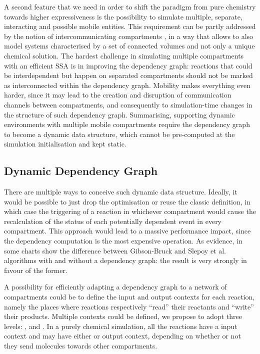 \documentclass[12pt,a4paper,twoside,openright]{book}
\begin{document}
A second feature that we need in order to shift the paradigm from pure chemistry towards higher expressiveness is the possibility to simulate multiple, separate, interacting and possible mobile entities.
%
This requirement can be partly addressed by the notion of intercommunicating compartments \cite{CiocchettaH09,versari08,montagna-cs2bio10,btssoc-jos7}, in a way that allows to also model systems characterised by a set of connected volumes and not only a unique chemical solution.
%
The hardest challenge in simulating multiple compartments with an efficient SSA is in improving the dependency graph: reactions that could be interdependent but happen on separated compartments should not be marked as interconnected within the dependency graph.
%
Mobility makes everything even harder, since it may lead to the creation and disruption of communication channels between compartments, and consequently to simulation-time changes in the structure of such dependency graph.
%
Summarising, supporting dynamic environments with multiple mobile compartments require the dependency graph to become a dynamic data structure, which cannot be pre-computed at the simulation initialisation and kept static.

\subsection{Dynamic Dependency Graph}

There are multiple ways to conceive such dynamic data structure.
%
Ideally, it would be possible to just drop the optimisation or reuse the classic definition, in which case the triggering of a reaction in whichever compartment would cause the recalculation of the status of each potentially dependent event in every compartment.
%
This approach would lead to a massive performance impact, since the dependency computation is the most expensive operation.
%
As evidence, in \cite{slepoy2008} some charts show the difference between Gibson-Bruck and Slepoy et al. algorithms with and without a dependency graph: the result is very strongly in favour of the former.

A possibility for efficiently adapting a dependency graph to a network of compartments could be to define the input and output contexts for each reaction, namely the places where reactions respectively ``read'' their reactants and ``write'' their products.
%
Multiple contexts could be defined, we propose to adopt three levels: \localc{}, \neighborhood{} and \globalc{}.
%
In a purely chemical simulation, all the reactions have a \localc{} input context and may have either \neighborhood{} or \localc{} output context, depending on whether or not they send molecules towards other compartments.
\end{document}
